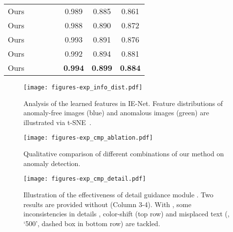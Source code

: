 \documentclass[final]{cvpr}
\begin{document}
\begin{table}[htbp]
\begin{center}
\begin{tabular}{lc cc cc cc}
			Ours                    &            & \checkmark &            &            & 0.989  &  0.885  & 0.861      \\
			\rowcolor{mygray}
			Ours                    & \checkmark & \checkmark &            &            & 0.988  &  0.890  & 0.872      \\
			Ours                    &            & \checkmark & \checkmark &            & 0.993  &  0.891  & 0.876      \\
			\rowcolor{mygray}
			Ours                    & \checkmark & \checkmark & \checkmark &            & 0.992 &  0.894  & 0.881     \\
			Ours                    & \checkmark & \checkmark & \checkmark & \checkmark & \textbf{0.994}  &  \textbf{0.899}  & \textbf{0.884}     \\
			\bottomrule[1.2pt]
		\end{tabular}
	\end{center}
	\vspace{-0.8cm}
\end{table}



\begin{figure} [htbp]
	\begin{center}
		\texttt{[image: figures-exp\_info\_dist.pdf]} 
	\end{center}
	\vspace{-0.2cm}
	\caption{Analysis of the learned features in IE-Net. Feature distributions of anomaly-free images (blue) and anomalous images (green) are illustrated via t-SNE~\cite{B:maaten2008visualizing}. }
	\label{fig:analysis}
	\vspace{-0.4cm}
\end{figure}


\begin{figure*} 
	\begin{center}
		\texttt{[image: figures-exp\_cmp\_ablation.pdf]} 
	\end{center}
	\vspace{-0.2cm}
	\caption{Qualitative comparison of different combinations of our method on anomaly detection.} 
	\label{fig:cmp_ablation}
	\vspace{-0.4cm}
\end{figure*}

\begin{figure} [htbp]
	\begin{center}
		\texttt{[image: figures-exp\_cmp\_detail.pdf]} 
	\end{center}
	\vspace{-0.2cm}
	\caption{Illustration of the effectiveness of detail guidance module . Two results are provided without  (Column 3-4). With , some inconsistencies in details \eg, color-shift (top row) and misplaced text (\ie, `500', dashed box in bottom row) are tackled.}
	\label{fig:cmp_detail}
	\vspace{-0.2cm}
\end{figure}
\end{document}
